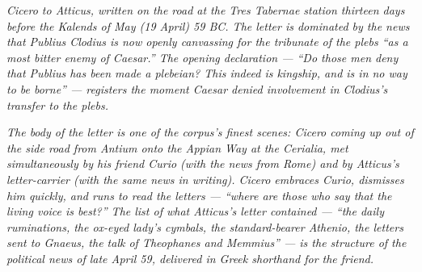 
\textit{Cicero to Atticus, written on the road at the Tres
Tabernae station thirteen days before the Kalends of May
(19 April) 59 BC. The letter is dominated by the news that
Publius Clodius is now openly canvassing for the tribunate
of the plebs ``as a most bitter enemy of Caesar.'' The
opening declaration --- ``Do those men deny that Publius
has been made a plebeian? This indeed is kingship, and is
in no way to be borne'' --- registers the moment Caesar
denied involvement in Clodius's transfer to the plebs.}

\textit{The body of the letter is one of the corpus's
finest scenes: Cicero coming up out of the side road from
Antium onto the Appian Way at the Cerialia, met
simultaneously by his friend Curio (with the news from
Rome) and by Atticus's letter-carrier (with the same news
in writing). Cicero embraces Curio, dismisses him quickly,
and runs to read the letters --- ``where are those who say
that the living voice is best?'' The list of what
Atticus's letter contained --- ``the daily ruminations, the
ox-eyed lady's cymbals, the standard-bearer Athenio, the
letters sent to Gnaeus, the talk of Theophanes and Memmius''
--- is the structure of the political news of late April 59,
delivered in Greek shorthand for the friend.}
